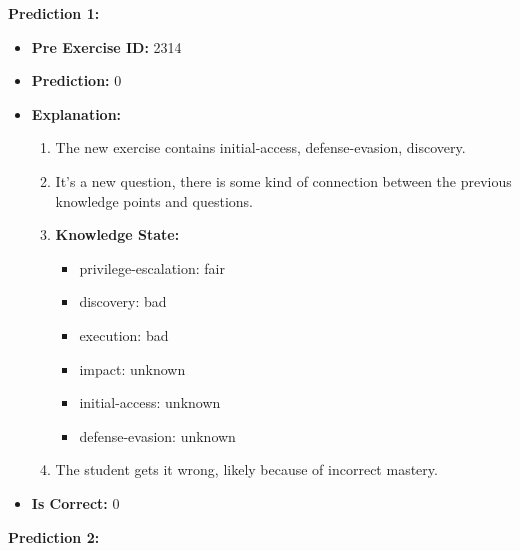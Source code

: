 \begin{figure*}[t]
\begin{tcolorbox}[
    sharpish corners,
    boxrule = 0pt,
    toprule = 0pt,
    enhanced
]
\small %
\textbf{Prediction 1:}  

\begin{itemize}[nolistsep, leftmargin=*]
    \item \textbf{Pre Exercise ID:} 2314
    \item \textbf{Prediction:} 0
    \item \textbf{Explanation:}  
    \begin{enumerate}
        \item The new exercise contains initial-access, defense-evasion, discovery.
        \item It's a new question, there is some kind of connection between the previous knowledge points and questions.
        \item \textbf{Knowledge State:}  
        \begin{itemize}[nolistsep, leftmargin=*]
            \item privilege-escalation: fair
            \item discovery: bad
            \item execution: bad
            \item impact: unknown
            \item initial-access: unknown
            \item defense-evasion: unknown
        \end{itemize}
        \item The student gets it wrong, likely because of incorrect mastery.
    \end{enumerate}
    \item \textbf{Is Correct:} 0
\end{itemize}

\textbf{Prediction 2:}  


\end{tcolorbox}
\end{figure*}
